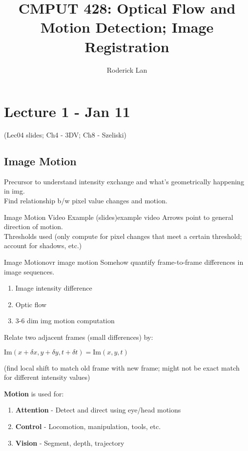 \documentclass{article}
\title{CMPUT 428: Optical Flow and Motion Detection; Image Registration}
\author{Roderick Lan}
\date{}
\begin{document}
\maketitle
\tableofcontents
\break

\section{Lecture 1 - Jan 11}
(Lec04 slides; Ch4 - 3DV; Ch8 - Szeliski)
\subsection{Image Motion}
Precursor to understand intensity exchange and what's geometrically happening in img. \\
Find relationship b/w pixel value changes and motion.
\begin{example}
    {Image Motion Video Example (slides)}{example video}
    Arrows point to general direction of motion.\\
    Thresholds used (only compute for pixel changes that meet a certain threshold; account for shadows, etc.)
\end{example}
\begin{ovr}
    {Image Motion}{ovr image motion}
    Somehow quantify frame-to-frame differences in image sequences.
    \begin{enumerate}
        \item Image intensity difference
        \item Optic flow
        \item 3-6 dim img motion computation
    \end{enumerate}
    Relate two adjacent frames (small differences) by:
    \begin{list}{}{}
        \item $\mathrm{Im}(x + \delta x, y + \delta y, t + \delta t) = \mathrm{Im}(x, y, t)$
        \item (find local shift to match old frame with new frame; might not be exact match for different intensity values)
    \end{list}
\end{ovr}

\textbf{Motion} is used for: 
\begin{enumerate}
    \item \textbf{Attention} - Detect and direct using eye/head motions
    \item \textbf{Control} - Locomotion, manipulation, tools, etc.
    \item \textbf{Vision} - Segment, depth, trajectory
\end{enumerate}
\end{document}
